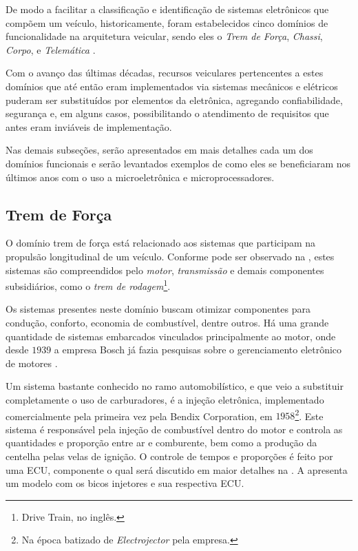 De modo a facilitar a classificação e identificação de sistemas eletrônicos que compõem um veículo, historicamente, foram estabelecidos cinco domínios de funcionalidade na arquitetura veicular, sendo eles o \emph{Trem de Força}, \emph{Chassi}, \emph{Corpo},  e \emph{Telemática} \cite{Auto:Lion2008}.

Com o avanço das últimas décadas, recursos veiculares pertencentes a estes domínios que até então eram implementados via sistemas mecânicos e elétricos puderam ser substituídos por elementos da eletrônica, agregando confiabilidade, segurança e, em alguns casos, possibilitando o atendimento de requisitos que antes eram inviáveis de implementação.

Nas demais subseções, serão apresentados em mais detalhes cada um dos domínios funcionais e serão levantados exemplos de como eles se beneficiaram nos últimos anos com o uso a microeletrônica e microprocessadores.

\subsection{Trem de Força}

O domínio trem de força está relacionado aos sistemas que participam na propulsão longitudinal de um veículo. Conforme pode ser observado na , estes sistemas são compreendidos pelo \emph{motor}, \emph{transmissão} e demais componentes subsidiários, como o \emph{trem de rodagem}\footnote{Drive Train, no inglês.}.


Os sistemas presentes neste domínio buscam otimizar componentes para condução, conforto, economia de combustível, dentre outros. Há uma grande quantidade de sistemas embarcados vinculados principalmente ao motor, onde desde $1939$ a empresa Bosch já fazia pesquisas sobre o gerenciamento eletrônico de motores \cite{BoschHistory}.

Um sistema bastante conhecido no ramo automobilístico, e que veio a substituir completamente o uso de carburadores, é a injeção eletrônica, implementado comercialmente pela primeira vez pela Bendix Corporation, em $1958$\footnote{Na época batizado de \emph{Electrojector} pela empresa.}\cite{Electrojector}. Este sistema é responsável pela injeção de combustível dentro do motor e controla as quantidades e proporção entre ar e comburente, bem como a produção da centelha pelas velas de ignição. O controle de tempos e proporções é feito por uma ECU, componente o qual será discutido em maior detalhes na . A  apresenta um modelo com os bicos injetores e sua respectiva ECU.

